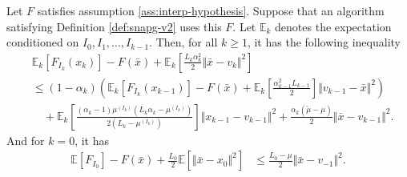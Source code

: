 \documentclass[12pt]{article}
\begin{document}
        \begin{theorem}\label{thm:snapg2-one-step}
            Let $F$ satisfies assumption \ref{ass:interp-hypothesis}. 
            Suppose that an algorithm satisfying Definition \ref{def:snapg-v2} uses this $F$. 
            Let $\mathbb E_k$ denotes the expectation conditioned on $I_0, I_1, \ldots, I_{k - 1}$. 
            Then, for all $k \ge 1$, it has the following inequality 
            \begin{align*}
                & \mathbb E_k\left[F_{I_k}(x_{k})\right] 
                - F(\bar x) 
                + \mathbb E_k\left[
                    \frac{L_k\alpha_k^2}{2}\Vert \bar x - v_k\Vert^2 
                \right]
                \\
                &\le 
                (1 - \alpha_k)\left(
                        \mathbb E_k \left[F_{I_k}(x_{k - 1})\right] 
                        - F(\bar x)
                        + \mathbb E_k \left[\frac{\alpha_{k - 1}^2L_{k - 1}}{2}\right]\Vert v_{k - 1} - \bar x\Vert^2
                \right)
                    \\ &\quad 
                    + \mathbb E_k\left[
                        \frac{(\alpha_k - 1)\mu^{(I_k)}\left(L_k\alpha_k - \mu^{(I_k)}\right)}{2\left(L_k - \mu^{(I_k)}\right)}
                    \right]\Vert x_{k - 1} - v_{k - 1} \Vert^2
                    + \frac{\alpha_k(\tilde\mu - \mu)}{2} 
                    \Vert \bar x - v_{k - 1}\Vert^2. 
            \end{align*}
            And for $k = 0$, it has 
            \begin{align*}
                \mathbb E \left[ F_{I_0}\right] - F(\bar x) 
                + \frac{L_0}{2}\mathbb E \left[\Vert \bar x - x_0\Vert^2\right]
                &\le 
                \frac{L_0 - \mu}{2}\Vert \bar x - v_{-1}\Vert^2. 
            \end{align*}
        \end{theorem}
\end{document}
